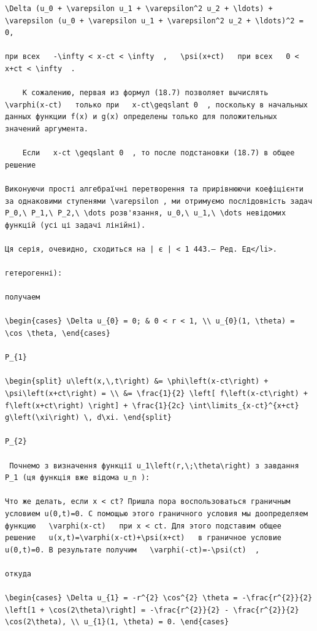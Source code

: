 \documentclass[
  ukrainian,
]{article}
\begin{document}
\begin{verbatim}
\Delta (u_0 + \varepsilon u_1 + \varepsilon^2 u_2 + \ldots) + \varepsilon (u_0 + \varepsilon u_1 + \varepsilon^2 u_2 + \ldots)^2 = 0,

при всех   -\infty < x-ct < \infty  ,   \psi(x+ct)   при всех   0 < x+ct < \infty  .

    К сожалению, первая из формул (18.7) позволяет вычислять   \varphi(x-ct)   только при   x-ct\geqslant 0  , поскольку в начальных данных функции f(x) и g(x) определены только для положительных значений аргумента.

    Если   x-ct \geqslant 0  , то после подстановки (18.7) в общее решение

Виконуючи прості алгебраїчні перетворення та прирівнюючи коефіцієнти за однаковими ступенями \varepsilon , ми отримуємо послідовність задач P_0,\ P_1,\ P_2,\ \dots розв'язання, u_0,\ u_1,\ \dots невідомих функцій (усі ці задачі лінійні).

Ця серія, очевидно, сходиться на | є | < 1 443.— Ред. Ед</li>.

гетерогенні):

получаем

\begin{cases} \Delta u_{0} = 0; & 0 < r < 1, \\ u_{0}(1, \theta) = \cos \theta, \end{cases}

P_{1}

\begin{split} u\left(x,\,t\right) &= \phi\left(x-ct\right) + \psi\left(x+ct\right) = \\ &= \frac{1}{2} \left[ f\left(x-ct\right) + f\left(x+ct\right) \right] + \frac{1}{2c} \int\limits_{x-ct}^{x+ct} g\left(\xi\right) \, d\xi. \end{split}

P_{2}

 Почнемо з визначення функції u_1\left(r,\;\theta\right) з завдання P_1 (ця функція вже відома u_n ):

Что же делать, если x < ct? Пришла пора воспользоваться граничным условием u(0,t)=0. С помощью этого граничного условия мы доопределяем функцию   \varphi(x-ct)   при x < ct. Для этого подставим общее решение   u(x,t)=\varphi(x-ct)+\psi(x+ct)   в граничное условие u(0,t)=0. В результате получим   \varphi(-ct)=-\psi(ct)  ,

откуда

\begin{cases} \Delta u_{1} = -r^{2} \cos^{2} \theta = -\frac{r^{2}}{2} \left[1 + \cos(2\theta)\right] = -\frac{r^{2}}{2} - \frac{r^{2}}{2} \cos(2\theta), \\ u_{1}(1, \theta) = 0. \end{cases}


\end{verbatim}
\end{document}
